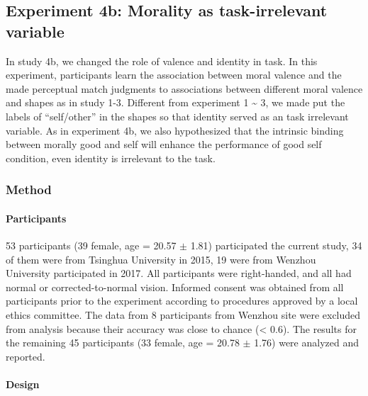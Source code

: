 \documentclass[
  english,
  man]{apa6}
\let\oldparagraph\paragraph
\renewcommand{\paragraph}[1]{\oldparagraph{#1}\mbox{}}
\begin{document}
\hypertarget{experiment-4b-morality-as-task-irrelevant-variable}{%
\subsection{Experiment 4b: Morality as task-irrelevant variable}\label{experiment-4b-morality-as-task-irrelevant-variable}}

In study 4b, we changed the role of valence and identity in task. In this experiment, participants learn the association between moral valence and the made perceptual match judgments to associations between different moral valence and shapes as in study 1-3. Different from experiment 1 \textasciitilde{} 3, we made put the labels of \enquote{self/other} in the shapes so that identity served as an task irrelevant variable. As in experiment 4b, we also hypothesized that the intrinsic binding between morally good and self will enhance the performance of good self condition, even identity is irrelevant to the task.

\hypertarget{method-7}{%
\subsubsection{Method}\label{method-7}}

\hypertarget{participants-9}{%
\paragraph{Participants}\label{participants-9}}

53 participants (39 female, age = 20.57 \(\pm\) 1.81) participated the current study, 34 of them were from Tsinghua University in 2015, 19 were from Wenzhou University participated in 2017. All participants were right-handed, and all had normal or corrected-to-normal vision. Informed consent was obtained from all participants prior to the experiment according to procedures approved by a local ethics committee. The data from 8 participants from Wenzhou site were excluded from analysis because their accuracy was close to chance (\textless{} 0.6). The results for the remaining 45 participants (33 female, age = 20.78 \(\pm\) 1.76) were analyzed and reported.

\hypertarget{design-4}{%
\paragraph{Design}\label{design-4}}
\end{document}
